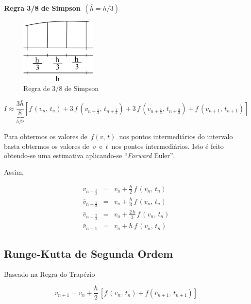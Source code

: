 \textbf{Regra 3/8 de Simpson} $ \, (\bar{h} = h/3) $

\begin{figure}[htb]
 \centering
 \includegraphics[scale=1.0]{capitulos/capitulo6/figuras/met_runge_kutta2.png}
 \caption{Regra de 3/8 de Simpson}
 \label{fig:met_runge_kutta2}
\end{figure}

\begin{equation}
 \label{cap6:sec3:eq6}
 I \approx \underbrace{\frac{3\bar{h}}{8}}_{h/9} [f \, (v_n, \, t_n) + 3 \, f \, (v_{n+\frac{1}{3}}, \, t_{n+\frac{1}{3}}) + 3 \, f \, (v_{n+\frac{2}{3}}, \, t_{n+\frac{2}{3}}) + f \, (v_{n+1}, \, t_{n+1})]
\end{equation}

Para obtermos os valores de $ \, f(v, \, t) \, $ nos pontos intermediários do intervalo basta obtermos os valores de $ \, v \, $ e $ \, t \, $ nos pontos intermediários. Isto é feito obtendo-se uma estimativa aplicando-se ``\textit{Forward} Euler''.

Assim,

\begin{eqnarray}
 \label{cap6:sec3:eq7}
 \bar{v}_{n+\frac{1}{2}} & = & v_n + \frac{h}{2} \, f \, (v_n, \, t_n) \\
 \label{cap6:sec3:eq8}
 \bar{v}_{n+\frac{1}{3}} & = & v_n + \frac{h}{3} \, f \, (v_n, \, t_n) \\
 \label{cap6:sec3:eq9}
 \bar{v}_{n+\frac{2}{3}} & = & v_n + \frac{2\,h}{3} \, f \, (v_n, \, t_n) \\
 \label{cap6:sec3:eq10}
 \bar{v}_{n+1} & = & v_n + h \, f \, (v_n, \, t_n)
\end{eqnarray}

\subsection{Runge-Kutta de Segunda Ordem}

Baseado na Regra do Trapézio

\begin{equation}
 v_{n+1} = v_n + \frac{h}{2} \, [f \, (v_n, \, t_n) + f(\bar{v}_{n+1}, \, t_{n+1})]
\end{equation}

